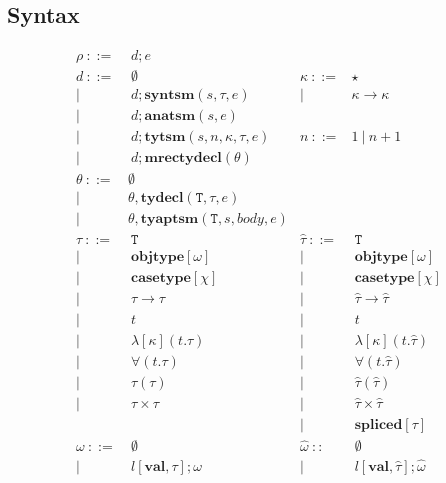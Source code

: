 \documentclass{sig-alternate}[10pt]
\newcommand{\T}{\mathtt{T}}
\begin{document}
\subsection{Syntax}
\[
\begin{array}{rlrlrl}
  \rho    ~::=&~ {d};e\\        
  {d}   ~::=&~ \emptyset                  & \kappa      ~::=& \star\\
        | ~ &~ {d}; \mathbf{syntsm}(s,\tau,e)     &   | ~ & \kappa\rightarrow\kappa\\
        | ~ &~ {d}; \mathbf{anatsm}(s,e)        \\
        | ~ &~ {d};\mathbf{tytsm}(s,n,\kappa,\tau,e)   & n ~ ::= &1 ~|~ n + 1     \\
        | ~ &~{d};\mathbf{mrectydecl}(\theta)\\
  \theta  ~::=& \emptyset \\
        | ~ & \theta,\mathbf{tydecl}(\T,\tau,e)\\
        | ~ & \theta,\mathbf{tyaptsm}(\T,s,body,e)\\
  \tau    ~::=&~ \T       &\hat{\tau} ~::=&~ \T\\
        |~  & ~ \mathbf{objtype}[\omega]    &|~ &~ \mathbf{objtype}[\omega]       \\
        |~  & ~ \mathbf{casetype}[\chi]     &|~ &~ \mathbf{casetype}[\chi]        \\
        |~  & ~ \tau\rightarrow\tau       &|~ &~ \hat\tau\rightarrow\hat\tau  \\
        |~  & ~ t               &|~ &~ t                  \\
        |~  & ~ \lambda[\kappa](t.\tau)     &|~ &~ \lambda[\kappa](t.\hat{\tau})\\
        |~  & ~ \forall(t.\tau)       &|~ &~ \forall(t.\hat{\tau})\\
        |~  & ~ \tau(\tau)            &|~ &~ \hat{\tau}(\hat{\tau})\\
        |~  & ~ \tau \times \tau        &|~ &~ \hat{\tau}\times\hat{\tau}\\
            &                 &|~ &~ \mathbf{spliced}[\tau]\\
  \omega ~::=&~   \emptyset             &\hat{\omega} ~::&~ \emptyset\\
   |~&    ~l[\mathbf{val}, \tau];\omega       &|~ & ~l[\mathbf{val}, \hat\tau];\hat\omega \\

\end{array}\]
\end{document}
